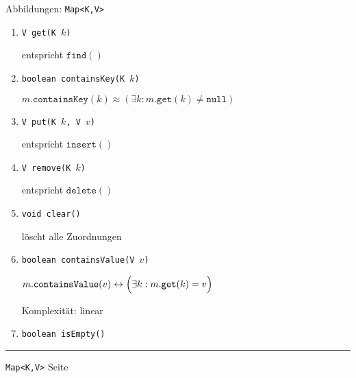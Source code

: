 \documentclass{slides}
\newcounter{mypage}
\begin{document}
\begin{slide}{}
\normalsize

\begin{center}
Abbildungen: \texttt{Map<K,V>}
\end{center}
\vspace*{0.5cm}

\footnotesize
\begin{enumerate}
\item \texttt{V get(K $k$)}
  
      entspricht $\texttt{find}()$
\item \texttt{boolean containsKey(K $k$)}

      $m.\mathtt{containsKey}(k) \approx (\exists k: m.\mathtt{get}(k) \not= \mathtt{null})$
\item \texttt{V put(K $k$, V $v$)}

      entspricht $\texttt{insert}()$ 
\item \texttt{V remove(K $k$)}
  
      entspricht  $\texttt{delete}()$ 
\item \texttt{void clear()}

      l\"oscht alle Zuordnungen
\item \texttt{boolean containsValue(V $v$)}

      $m.\mathtt{containsValue}(v) \leftrightarrow \Bigl(\exists k: m.\mathtt{get}(k) = v\Bigr)$

      Komplexit\"at: linear 
\item \texttt{boolean isEmpty()}
  
\end{enumerate}


\vspace*{\fill}
\tiny \addtocounter{mypage}{1}
\rule{17cm}{1mm}
\texttt{Map<K,V>} \hspace*{\fill} Seite 
\end{slide}

\end{document}
